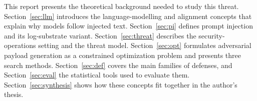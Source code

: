 This report presents the theoretical background needed to study this threat. Section~\ref{sec:llm} introduces the language-modelling and alignment concepts that explain why models follow injected text. Section~\ref{sec:pi} defines prompt injection and its log-substrate variant. Section~\ref{sec:threat} describes the security-operations setting and the threat model. Section~\ref{sec:opt} formulates adversarial payload generation as a constrained optimization problem and presents three search methods. Section~\ref{sec:def} covers the main families of defenses, and Section~\ref{sec:eval} the statistical tools used to evaluate them. Section~\ref{sec:synthesis} shows how these concepts fit together in the author's thesis.
